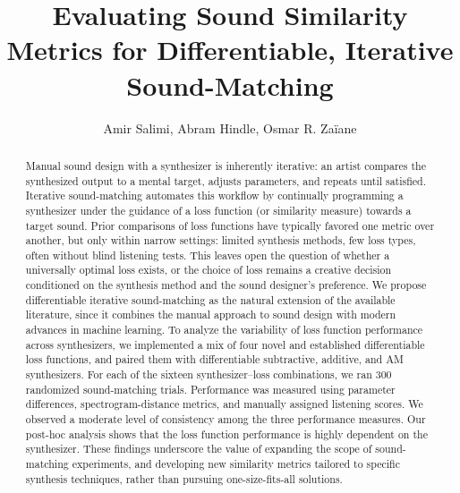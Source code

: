 \documentclass[lettersize,journal]{IEEEtran}
\begin{document}
\title{Evaluating Sound Similarity Metrics for Differentiable, Iterative Sound-Matching}

\author{Amir Salimi, Abram Hindle, Osmar R. Za{\"i}ane}



\maketitle

\begin{abstract}
Manual sound design with a synthesizer is inherently iterative: an artist compares the synthesized output to a mental target, adjusts parameters, and repeats until satisfied. Iterative sound-matching automates this workflow by continually programming a synthesizer under the guidance of a loss function (or similarity measure) towards a target sound. Prior comparisons of loss functions have typically favored one metric over another, but only within narrow settings: limited synthesis methods, few loss types, often without blind listening tests. This leaves open the question of whether a universally optimal loss exists, or the choice of loss remains a creative decision conditioned on the synthesis method and the sound designer's preference. We propose differentiable iterative sound-matching as the natural extension of the available literature, since it combines the manual approach to sound design with modern advances in machine learning. To analyze the variability of loss function performance across synthesizers, we implemented a mix of four novel and established differentiable loss functions, and paired them with differentiable subtractive, additive, and AM synthesizers. For each of the sixteen synthesizer–loss combinations, we ran 300 randomized sound-matching trials. Performance was measured using parameter differences, spectrogram-distance metrics, and manually assigned listening scores. We observed a moderate level of consistency among the three performance measures. Our post-hoc analysis shows that the loss function performance is highly dependent on the synthesizer. These findings underscore the value of expanding the scope of sound-matching experiments, and developing new similarity metrics tailored to specific synthesis techniques, rather than pursuing one-size-fits-all solutions.
\end{abstract}
\end{document}
